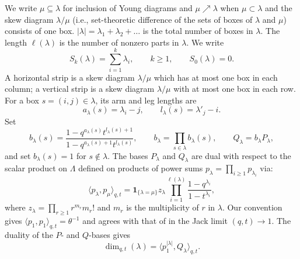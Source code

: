 \documentclass[11pt,reqno]{amsart}
\theoremstyle{definition}
\theoremstyle{remark}
\numberwithin{equation}{section}
\newcommand{\ddim}{\operatorname{dim}_{q,t}}
\begin{document}
We write $\mu\subseteq\lambda$ for inclusion of Young diagrams and
$\mu\nearrow\lambda$ when $\mu\subset \lambda$ and the skew diagram $\lambda/\mu$ (i.e., set-theoretic difference of the sets of boxes of $\lambda$ and $\mu$) consists of one box. $|\lambda|=\lambda_1+\lambda_2+\dots$ is the total number of boxes in $\lambda$.
The length $\ell(\lambda)$ is the number of nonzero parts in $\lambda$. We write
\begin{equation}\label{eq:partial-sums}
 S_k(\lambda)=\sum_{i=1}^k\lambda_i,\qquad k\ge1,\qquad S_0(\lambda)=0.
\end{equation}
A horizontal strip is a skew diagram $\lambda/\mu$ which has at most one box in each column; a vertical
strip is a skew diagram $\lambda/\mu$ with at most one box in each row. For a box $s=(i,j)\in\lambda$, its
arm and leg lengths are
\[
 a_\lambda(s)=\lambda_i-j,\qquad l_\lambda(s)=\lambda'_j-i.
\]
Set
\begin{equation}\label{eq:b}
 b_\lambda(s)=
 \frac{1-q^{a_\lambda(s)}t^{l_\lambda(s)+1}}
      {1-q^{a_\lambda(s)+1}t^{l_\lambda(s)}},
 \qquad b_\lambda=\prod_{s\in\lambda}b_\lambda(s),
 \qquad Q_\lambda=b_\lambda P_\lambda,
\end{equation}
and set $b_\lambda(s)=1$ for $s\notin\lambda$.
The bases $P_\lambda$ and $Q_\lambda$ are dual with respect to the scalar product on $\Lambda$ defined on products of power sums $p_\lambda=\prod_{i\ge 1} p_{\lambda_i}$ via:
\begin{equation}\label{eq:scalar-product}
 \langle p_\lambda,p_\mu\rangle_{q,t}
 =\mathbf1_{\{\lambda=\mu\}}z_\lambda
   \prod_{i=1}^{\ell(\lambda)}\frac{1-q^{\lambda_i}}{1-t^{\lambda_i}},
\end{equation}
where $z_\lambda=\prod_{r\ge1}r^{m_r}m_r!$ and $m_r$ is the multiplicity
of $r$ in $\lambda$. Our convention gives
$\langle p_1,p_1\rangle_{q,t}=\theta^{-1}$ and agrees with that of \cite{KOO98} in the Jack limit $(q,t)\to 1$. The duality of the $P$- and $Q$-bases gives
\begin{equation}\label{eq:dimension-pairing}
 \ddim(\lambda)=\langle p_1^{|\lambda|},Q_\lambda\rangle_{q,t}.
\end{equation}
\end{document}
